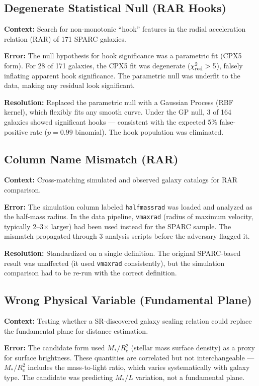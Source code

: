 \documentclass[twocolumn]{aastex631}
\begin{document}
\subsection{Degenerate Statistical Null (RAR Hooks)}

\textbf{Context:} Search for non-monotonic ``hook'' features in the radial
acceleration relation (RAR) of 171 SPARC galaxies.

\textbf{Error:} The null hypothesis for hook significance was a parametric
fit (CPX5 form).  For 28 of 171 galaxies, the CPX5 fit was degenerate
($\chi^2_{\rm red} > 5$), falsely inflating apparent hook significance.
The parametric null was underfit to the data, making any residual look
significant.

\textbf{Resolution:} Replaced the parametric null with a Gaussian Process
(RBF kernel), which flexibly fits any smooth curve.  Under the GP null,
3 of 164 galaxies showed significant hooks --- consistent with the
expected 5\% false-positive rate ($p=0.99$ binomial).  The hook
population was eliminated.

\subsection{Column Name Mismatch (RAR)}

\textbf{Context:} Cross-matching simulated and observed galaxy catalogs
for RAR comparison.

\textbf{Error:} The simulation column labeled \texttt{halfmassrad} was
loaded and analyzed as the half-mass radius.  In the data pipeline,
\texttt{vmaxrad} (radius of maximum velocity, typically 2--3$\times$ larger)
had been used instead for the SPARC sample.  The mismatch propagated
through 3 analysis scripts before the adversary flagged it.

\textbf{Resolution:} Standardized on a single definition.  The original
SPARC-based result was unaffected (it used \texttt{vmaxrad} consistently),
but the simulation comparison had to be re-run with the correct definition.

\subsection{Wrong Physical Variable (Fundamental Plane)}

\textbf{Context:} Testing whether a SR-discovered galaxy scaling relation
could replace the fundamental plane for distance estimation.

\textbf{Error:} The candidate form used $M_*/R_e^2$ (stellar mass surface
density) as a proxy for surface brightness.  These quantities are
correlated but not interchangeable --- $M_*/R_e^2$ includes the
mass-to-light ratio, which varies systematically with galaxy type.
The candidate was predicting $M_*/L$ variation, not a fundamental plane.
\end{document}
